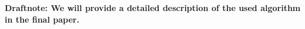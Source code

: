 \textbf{Draftnote: We will provide a detailed description of the used algorithm in the final paper.}